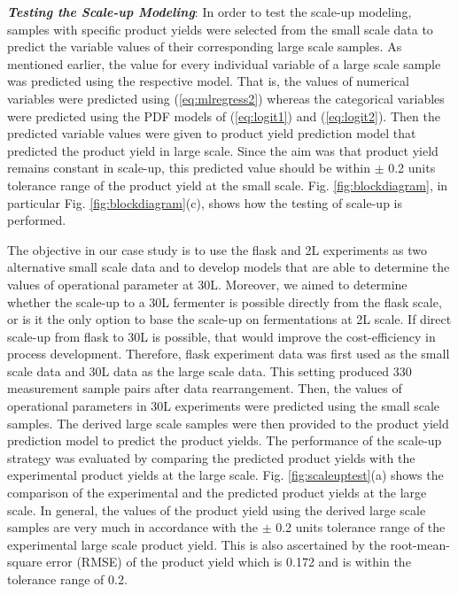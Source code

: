 \documentclass{article}
\begin{document}
\noindent \textit{\textbf{Testing the Scale-up Modeling}}:
In order to test the scale-up modeling, samples with specific product yields were selected from the small scale data to predict the variable values of their corresponding large scale samples. As mentioned earlier, the value for every individual variable of a large scale sample was predicted using the respective model. That is, the values of numerical variables were predicted using (\ref{eq:mlregress2}) whereas the categorical variables were predicted using the PDF models of (\ref{eq:logit1}) and (\ref{eq:logit2}). Then the predicted variable values were given to product yield prediction model that predicted the product yield in large scale. Since the aim was that product yield remains constant in scale-up, this predicted value should be within $\pm$ 0.2 units tolerance range of the product yield at the small scale. Fig. \ref{fig:blockdiagram}, in particular Fig. \ref{fig:blockdiagram}(c), shows how the testing of scale-up is performed.

The objective in our case study is to use the flask and 2L experiments as two alternative small scale data and to develop models that are able to determine the values of operational parameter at 30L. Moreover, we aimed to determine whether the scale-up to a 30L fermenter is possible directly from the flask scale, or is it the only option to base the scale-up on fermentations at 2L scale.  If direct scale-up from flask to 30L is possible, that would improve the cost-efficiency in process development. Therefore, flask experiment data was first used as the small scale data and 30L data as the large scale data. This setting produced 330 measurement sample pairs after data rearrangement. Then, %
the values of operational parameters in 30L experiments were predicted using the small scale samples. The derived large scale samples were then provided to the product yield prediction model to predict the product yields. The performance of the scale-up strategy was evaluated by comparing the predicted product yields with the experimental product yields at the large scale. Fig. \ref{fig:scaleuptest}(a) shows the comparison of the experimental and the predicted product yields at the large scale. In general, the values of the product yield using the derived large scale samples are very much in accordance with the $\pm$ 0.2 units tolerance range of the experimental large scale product yield. This is also ascertained by the root-mean-square error (RMSE) of the product yield which is 0.172 and is within the tolerance range of 0.2.
\end{document}
